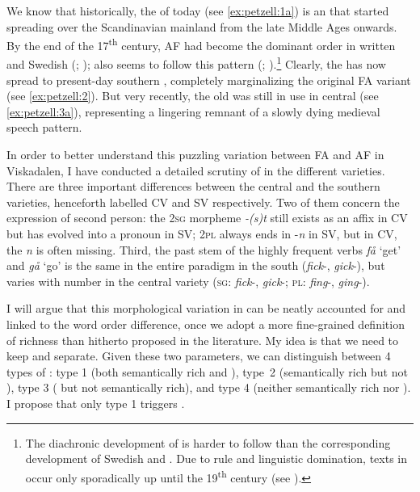\documentclass[output=paper,colorlinks,citecolor=brown,draft,draftmode]{langscibook}
\begin{document}
We know that historically, the  of today (see \ref{ex:petzell:1a}) is an  that started spreading over the Scandinavian mainland from the late Middle Ages onwards. By the end of the 17\textsuperscript{th} century, AF had become the dominant order in written  \citep{Sundquist2003} and Swedish (\citealt{Falk1993}; \citealt{Hakansson2011});  also seems to follow this pattern (\citealt{Christoffersen1997}; \citealt{Vitterso2004}).\footnote{The diachronic development of  is harder to follow than the corresponding development of Swedish and . Due to  rule and linguistic domination, texts in  occur only sporadically up until the 19\textsuperscript{th} century (see \citealt[177–192]{Indrebo2001}).} Clearly, the  has now spread to present-day southern , completely marginalizing the original FA variant (see \ref{ex:petzell:2}). But very recently, the old  was still in use in central  (see \ref{ex:petzell:3a}), representing a lingering remnant of a slowly dying medieval speech pattern.



In order to better understand this puzzling variation between FA and AF in Viskadalen, I have conducted a detailed scrutiny of  in the different  varieties. There are three important differences between the central and the southern varieties, henceforth labelled CV and SV respectively. Two of them concern the expression of second person: the 2\textsc{sg} morpheme \textit{-(s)t} still exists as an affix in CV but has evolved into a pronoun in SV; 2\textsc{pl} always ends in -\textit{n} in SV, but in CV, the \textit{n} is often missing. Third, the past  stem of the highly frequent verbs \textit{få} ‘get’ and \textit{gå} ‘go’ is the same in the entire paradigm in the south (\textit{fick}-, \textit{gick}-), but varies with number in the central variety (\textsc{sg}: \textit{fick}-, \textit{gick}-; \textsc{pl}: \textit{fing}-, \textit{ging}-).



I will argue that this morphological variation in  can be neatly accounted for and linked to the word order difference, once we adopt a more fine-grained definition of  richness than hitherto proposed in the literature. My idea is that we need to keep  and  separate. Given these two parameters, we can distinguish between 4 types of : type 1 (both semantically rich and ), type~2 (semantically rich but not ), type 3 ( but not semantically rich), and type 4 (neither semantically rich nor ). I propose that only type 1  triggers .
\end{document}
